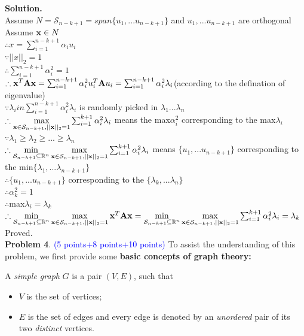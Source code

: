 \documentclass[english,onecolumn]{IEEEtran}
\newcommand{\Rbb}{\mathbb{R}}
\newcommand{\bigS}{\mathcal{S}}
\newcommand{\bA}{{\bf A}}
\newcommand{\bx}{{\bf x}}
\begin{document}
\noindent
\textbf{Solution.}\\
Assume $N=\bigS_{n-k+1}=span\{u_1,...u_{n-k+1}\}$ and $u_1,...u_{n-k+1}$ are orthogonal\\
Assume $ \bx\in N$\\
$\therefore x=\sum_{i=1}^{n-k+1} \alpha_{i} u_{i}$\\
$\because ||x||_2=1$\\
$\therefore \sum_{i=1}^{n-k+1} \alpha_{i}^2=1$\\
$\therefore \bx^T\bA\bx=\sum_{i=1}^{n-k+1}\alpha_{i}^2 u_{i}^T\bA u_i=\sum_{i=1}^{n-k+1}\alpha_{i}^2\lambda_i$(according to the defination of eigenvalue)\\
$\because \lambda_i  in  \sum_{i=1}^{n-k+1}\alpha_{i}^2\lambda_i$ is randomly picked in $\lambda_1...\lambda_n$\\
$\therefore \max\limits_{\bx\in\bigS_{n-k+1},||\bx||_2=1}\sum_{i=1}^{k+1}\alpha_{i}^2\lambda_i$ means the max$\alpha_{i}^2$ corresponding to the max$\lambda_i$\\
$\because \lambda_1\geq \lambda_2\geq...\geq \lambda_n$\\
$\therefore \min\limits_{\bigS_{n-k+1}\subseteq \Rbb^n}\max\limits_{\bx\in\bigS_{n-k+1},||\bx||_2=1}\sum_{i=1}^{k+1}\alpha_{i}^2\lambda_i$ means $\{u_1,...u_{n-k+1}\}$ corresponding to the min$\{\lambda_1,...\lambda_{n-k+1}\}$ \\
$\therefore \{u_1,...u_{n-k+1}\}$ corresponding to the $\{\lambda_{k},...\lambda_{n}\}$\\
$\therefore \alpha_k^2=1$\\
$\therefore$max$\lambda_i=\lambda_k$\\
$\therefore \min\limits_{\bigS_{n-k+1}\subseteq \Rbb^n}\max\limits_{\bx\in\bigS_{n-k+1},||\bx||_2=1} \bx^T\bA\bx=\min\limits_{\bigS_{n-k+1}\subseteq \Rbb^n}\max\limits_{\bx\in\bigS_{n-k+1},||\bx||_2=1}\sum_{i=1}^{k+1}\alpha_{i}^2\lambda_i=\lambda_k$\\
Proved.\\








\newpage
\noindent\textbf{Problem 4}. \textcolor{blue}{(5 points+8 points+10 points)}
\noindent To assist the understanding of this problem, we first provide some \textbf{basic concepts of graph theory:}
 
 A \textit{simple graph} $G$ is a pair $(V,E)$, such that
\begin{itemize}
	\item 
	$V$ is the set of vertices;
	
	\item 
	$E$ is the set of edges and every edge is denoted by an \textit{unordered} pair of its two \textit{distinct} vertices.
\end{itemize}
\end{document}
